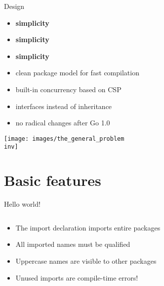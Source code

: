 \documentclass[10pt]{beamer}
\newcommand{\inv}{-inv}
\begin{document}
	
	\begin{frame}{Design}
		\begin{itemize}
			\item \textbf{simplicity}
			\item \textbf{simplicity}
			\item \textbf{simplicity}
			\item clean package model for fast compilation
			\item built-in concurrency based on CSP
			\item interfaces instead of inheritance
			\item no radical changes after Go 1.0
		\end{itemize}
	\end{frame}
	
	
	\begin{frame}
		\begin{center}
			\texttt{[image: images/the\_general\_problem\\inv]}
		\end{center}
	\end{frame}

	
	\section{Basic features}
	
	
	\begin{frame}[t,fragile]{Hello world!}
		\inputminted{go}{code/01_hello.go}
		\vspace*{-4ex}
		\begin{itemize}
			\item The import declaration imports entire packages
			\item All imported names must be qualified
			\item Uppercase names are visible to other packages
			\item Unused imports are compile-time errors!
		\end{itemize}
\end{frame}
	
	
\end{document}
